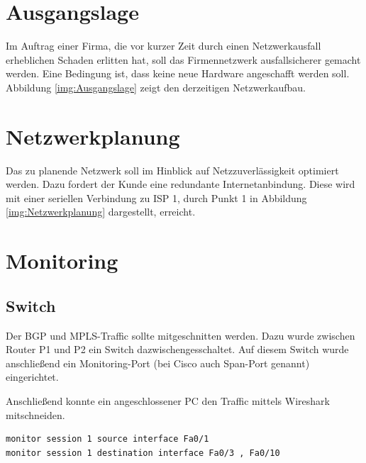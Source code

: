 \thispagestyle{standard}
\pagestyle{standard}
\chapter{Ausgangslage}

Im Auftrag einer Firma, die vor kurzer Zeit durch einen Netzwerkausfall erheblichen Schaden erlitten hat, soll das Firmennetzwerk ausfallsicherer gemacht werden. Eine Bedingung ist, dass keine neue Hardware angeschafft werden soll. Abbildung \ref{img:Ausgangslage} zeigt den derzeitigen Netzwerkaufbau.


\chapter{Netzwerkplanung}

Das zu planende Netzwerk soll im Hinblick auf Netzzuverlässigkeit optimiert werden. Dazu fordert der Kunde eine redundante Internetanbindung. Diese wird mit einer seriellen Verbindung zu \ac{ISP} 1, durch Punkt 1 in Abbildung \ref{img:Netzwerkplanung} dargestellt, erreicht. 



\chapter{Monitoring}

\section{Switch}

Der \ac{BGP} und \ac{MPLS}-Traffic sollte mitgeschnitten werden.
Dazu wurde zwischen Router P1 und P2 ein Switch dazwischengesschaltet. Auf diesem Switch wurde anschließend ein Monitoring-Port (bei Cisco auch Span-Port genannt) eingerichtet.

Anschließend konnte ein angeschlossener PC den Traffic mittels Wireshark mitschneiden.

\begin{lstlisting}[caption={Monitoring-Ports},label={lst:mon},language={}]
monitor session 1 source interface Fa0/1
monitor session 1 destination interface Fa0/3 , Fa0/10
\end{lstlisting}

